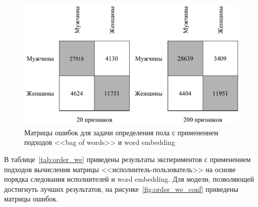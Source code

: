\begin{figure}[!h]
\caption{Матрицы ошибок для задачи определения пола с
         применением подходов <<bag of words>> и
         word embedding}
\label{fig:bow_we_conf}
\centering
\includegraphics[scale=0.75]{figs/bow-we-confusion.pdf}
\end{figure}

В таблице~\ref{tab:order_we} приведены результаты
экспериментов с применением подходов вычисления матрицы
<<исполнитель-пользователь>> на основе порядка следования
исполнителей и word embedding. Для модели, позволяющей
достигнуть лучших результатов, на рисунке~\ref{fig:order_we_conf}
приведены матрицы ошибок.

